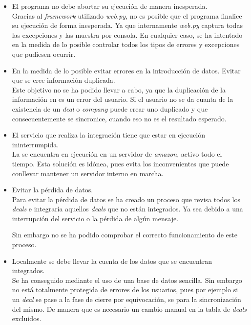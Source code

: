 \begin{itemize}
	\item El programa no debe abortar su ejecución de manera inesperada.\\
	
	Gracias al \textit{framework} utilizado \textit{web.py}, no es posible que el programa finalice su ejecución de forma inesperada. 
	Ya que internamente \textit{web.py} captura todas las excepciones y las muestra por consola. En cualquier caso, se ha intentado en la medida de lo posible controlar todos los tipos de errores y excepciones que pudiesen ocurrir.
	
	\item En la medida de lo posible evitar errores en la introducción de datos. Evitar que se cree información duplicada.\\
	
	Este objetivo no se ha podido llevar a cabo, ya que la duplicación de la información en \hs{} es un error del usuario. Si el usuario no se da cuanta de la existencia de un \textit{deal} o \textit{company} puede crear uno duplicado y que consecuentemente se sincronice, cuando eso no es el resultado esperado.
	
	
	\item El servicio que realiza la integración tiene que estar en ejecución ininterrumpida.\\
	
	La \iface{} se encuentra en ejecución en un servidor de \textit{amazon}, activo todo el tiempo. Esta solución es idónea, pues evita los inconvenientes que puede conllevar mantener un servidor interno en marcha.
	
	\item Evitar la pérdida de datos.\\
	
	Para evitar la pérdida de datos se ha creado un proceso que revisa todos los \textit{deals} e integraría aquellos \textit{deals} que no están integrados. 
	Ya sea debido a una interrupción del servicio o la pérdida de algún mensaje.
	
	Sin embargo no se ha podido comprobar el correcto funcionamiento de este proceso.
	\item Localmente se debe llevar la cuenta de los datos que se encuentran integrados.\\
	
	Se ha conseguido mediante el uso de una base de datos sencilla.
	Sin embargo no está totalmente protegida de errores  de los usuarios, pues por ejemplo si un \textit{deal} se pase a la fase de cierre por equivocación, se para la sincronización del mismo.
	De manera que es necesario un cambio manual en la tabla de \textit{deals} excluidos.
	

\end{itemize}

